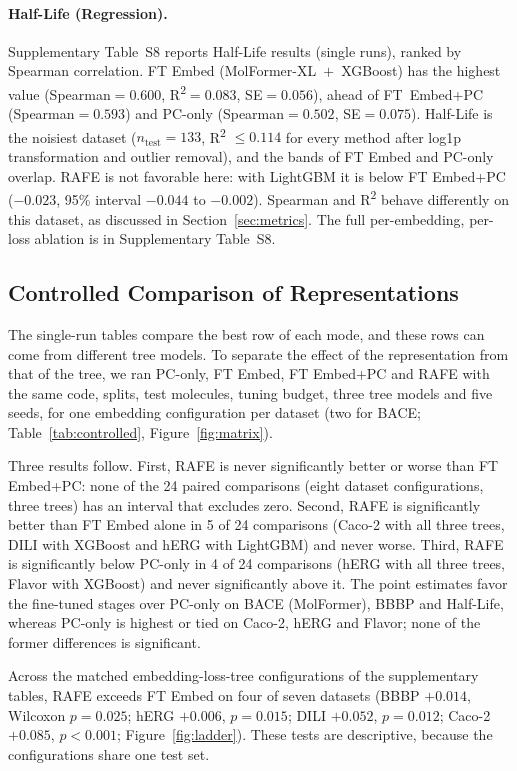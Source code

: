 \documentclass[pdflatex,sn-basic]{sn-jnl}%
\begin{document}
\paragraph{Half-Life (Regression).} Supplementary Table~S8 reports Half-Life results (single runs), ranked by Spearman correlation. FT Embed (MolFormer-XL~$+$~XGBoost) has the highest value (Spearman$=0.600$, R\textsuperscript{2}$=0.083$, SE$=0.056$), ahead of FT~Embed+PC (Spearman$=0.593$) and PC-only (Spearman$=0.502$, SE$=0.075$). Half-Life is the noisiest dataset ($n_\text{test}=133$, R\textsuperscript{2} $\le 0.114$ for every method after log1p transformation and outlier removal), and the bands of FT Embed and PC-only overlap. RAFE is not favorable here: with LightGBM it is below FT Embed+PC ($-0.023$, 95\% interval $-0.044$ to $-0.002$). Spearman and R\textsuperscript{2} behave differently on this dataset, as discussed in Section~\ref{sec:metrics}. The full per-embedding, per-loss ablation is in Supplementary Table~S8.

\FloatBarrier
\subsection{Controlled Comparison of Representations}\label{sec:controlled}
The single-run tables compare the best row of each mode, and these rows can come from different tree models. To separate the effect of the representation from that of the tree, we ran PC-only, FT Embed, FT Embed+PC and RAFE with the same code, splits, test molecules, tuning budget, three tree models and five seeds, for one embedding configuration per dataset (two for BACE; Table~\ref{tab:controlled}, Figure~\ref{fig:matrix}).

Three results follow. First, RAFE is never significantly better or worse than FT Embed+PC: none of the 24 paired comparisons (eight dataset configurations, three trees) has an interval that excludes zero. Second, RAFE is significantly better than FT Embed alone in 5 of 24 comparisons (Caco-2 with all three trees, DILI with XGBoost and hERG with LightGBM) and never worse. Third, RAFE is significantly below PC-only in 4 of 24 comparisons (hERG with all three trees, Flavor with XGBoost) and never significantly above it. The point estimates favor the fine-tuned stages over PC-only on BACE (MolFormer), BBBP and Half-Life, whereas PC-only is highest or tied on Caco-2, hERG and Flavor; none of the former differences is significant.

Across the matched embedding-loss-tree configurations of the supplementary tables, RAFE exceeds FT Embed on four of seven datasets (BBBP $+0.014$, Wilcoxon $p=0.025$; hERG $+0.006$, $p=0.015$; DILI $+0.052$, $p=0.012$; Caco-2 $+0.085$, $p<0.001$; Figure~\ref{fig:ladder}). These tests are descriptive, because the configurations share one test set.
\end{document}

